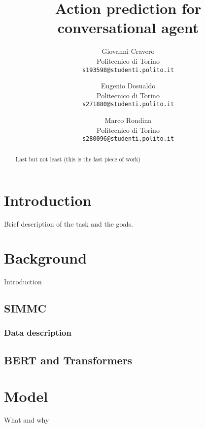 \documentclass[final]{cvpr}
\begin{document}
	
	\title{Action prediction for conversational agent}
	
	\author{Giovanni Cravero\\
		Politecnico di Torino\\
		{\tt\small s193598@studenti.polito.it}
		\and
		Eugenio Dosualdo\\
		Politecnico di Torino\\
		{\tt\small s271880@studenti.polito.it}
		\and
		Marco Rondina\\
		Politecnico di Torino\\
		{\tt\small s280096@studenti.polito.it}
	}
	
	\maketitle
	
	\begin{abstract}
		Last but not least (this is the last piece of work)
	\end{abstract}
	
	\section{Introduction}
	Brief description of the task and the goals.
	
	\section{Background}
	Introduction
	\subsection{SIMMC}
	
	\subsubsection{Data description}
	
	\subsection{BERT and Transformers}
	
	\section{Model}
	What and why
	
\end{document}
